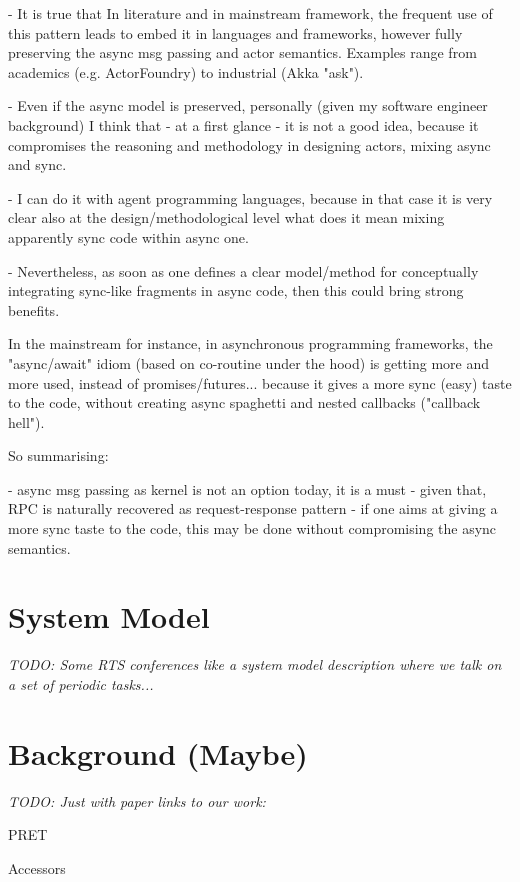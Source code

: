 \documentclass[a4paper, conference]{IEEEtran}
\newcommand{\todo}[1]{{\emph{TODO: #1}}}
\begin{document}
- It is true that In literature and in mainstream framework, the frequent use of this pattern leads
  to embed it in languages and frameworks, however fully preserving the async msg passing
  and actor semantics.   Examples range from academics (e.g. ActorFoundry) to industrial (Akka "ask").

- Even if the async model is preserved, personally  (given my software engineer background)
  I think that - at a first glance - it is not a good idea, because it  compromises the reasoning
  and methodology in designing actors, mixing async and sync.

- I can do it with agent programming languages, because in that  case it is very clear also
  at the design/methodological level what does it mean mixing apparently sync code within async one.

- Nevertheless, as soon as one defines a clear model/method for conceptually integrating
  sync-like fragments in async code, then this could bring strong benefits.

  In the mainstream for instance, in asynchronous programming frameworks, the "async/await"
  idiom (based on co-routine under the hood) is getting more and more used, instead of
  promises/futures... because it gives a more sync (easy) taste to the code, without creating
  async spaghetti and nested callbacks ("callback hell").

So summarising:

- async msg passing as kernel is not an option today, it is a must
- given that, RPC is naturally recovered as request-response pattern
- if one aims at giving a more sync taste to the code, this may be done
  without compromising the async semantics.

\section{System Model}
\label{sec:sysmod}

\todo{Some RTS conferences like a system model description where we talk
on a set of periodic tasks...}

\section{Background (Maybe)}

\todo{Just with paper links to our work:}

PRET \cite{pret:dac2007} \cite{pret:cases:2008}

Accessors
\end{document}
